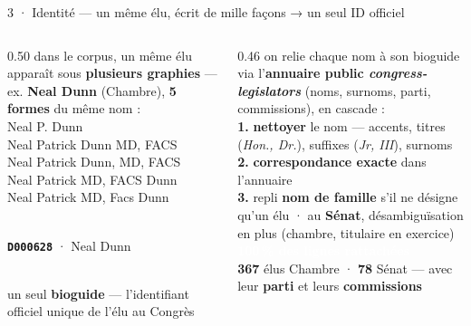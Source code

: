 \documentclass[11pt,aspectratio=169]{beamer}
\newcommand{\co}[1]{\texttt{#1}}
\newcommand{\badge}[2]{\colorbox{#1}{\textcolor{white}{\footnotesize\textbf{#2}}}}
\newcommand{\senat}{\textcolor{selec}{\textbf{Sénat}}}
\begin{document}
\begin{frame}{3 · Identité --- un même élu, écrit de mille façons → un seul ID officiel}
  \begin{columns}[T]
    \begin{column}{0.50\textwidth}
      {\footnotesize dans le corpus, un même élu apparaît sous \textbf{plusieurs graphies} ---
       ex. \textbf{Neal Dunn} (Chambre), \textbf{5 formes} du même nom :}\\[1.5mm]
      {\scriptsize\ttfamily\color{black!75}
       Neal P. Dunn\\
       Neal Patrick Dunn MD, FACS\\
       Neal Patrick Dunn, MD, FACS\\
       Neal Patrick MD, FACS Dunn\\
       Neal Patrick MD, Facs Dunn}\\[2mm]
      \centering{\Large\color{okgreen}$\Downarrow$}\\[1.5mm]
      \colorbox{okgreen}{\parbox{0.86\linewidth}{\centering\vspace{0.4mm}
        {\color{white}\textbf{\co{D000628}} · Neal Dunn}\vspace{0.4mm}}}\\[1.5mm]
      {\scriptsize\color{black!60} un seul \textbf{bioguide} --- l'identifiant officiel unique
       de l'élu au Congrès}
    \end{column}
    \begin{column}{0.46\textwidth}
      {\footnotesize on relie chaque nom à son bioguide via l'\textbf{annuaire public
       \emph{congress-legislators}} (noms, surnoms, parti, commissions), en cascade :}\\[2mm]
      {\footnotesize
       \textbf{1.} \textbf{nettoyer} le nom --- accents, titres (\emph{Hon., Dr.}),
       suffixes (\emph{Jr, III}), surnoms\\[0.8mm]
       \textbf{2.} \textbf{correspondance exacte} dans l'annuaire\\[0.8mm]
       \textbf{3.} repli \textbf{nom de famille} s'il ne désigne qu'un élu \;·\; au \senat{},
       désambiguïsation en plus (chambre, titulaire en exercice)}\\[3mm]
      \badge{okgreen}{100\,\% des lignes rattachées}\\[1.2mm]
      {\footnotesize \textbf{367} élus Chambre · \textbf{78} Sénat --- avec leur \textbf{parti}
       et leurs \textbf{commissions}}
    \end{column}
  \end{columns}
\end{frame}
\end{document}
